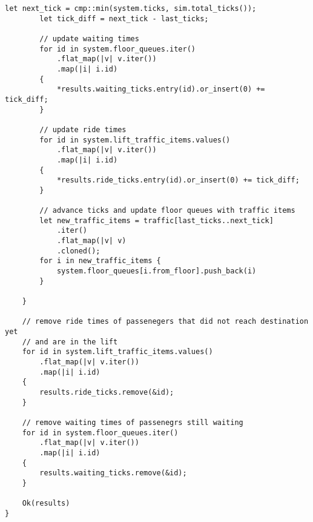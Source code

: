 \begin{lstlisting}[caption={Implementation of a single simulation run}, label={lst:app:simsinglerun}]
        let next_tick = cmp::min(system.ticks, sim.total_ticks());
        let tick_diff = next_tick - last_ticks;

        // update waiting times
        for id in system.floor_queues.iter()
            .flat_map(|v| v.iter())
            .map(|i| i.id)
        {
            *results.waiting_ticks.entry(id).or_insert(0) += tick_diff;
        }

        // update ride times
        for id in system.lift_traffic_items.values()
            .flat_map(|v| v.iter())
            .map(|i| i.id)
        {
            *results.ride_ticks.entry(id).or_insert(0) += tick_diff;
        }

        // advance ticks and update floor queues with traffic items
        let new_traffic_items = traffic[last_ticks..next_tick]
            .iter()
            .flat_map(|v| v)
            .cloned();
        for i in new_traffic_items {
            system.floor_queues[i.from_floor].push_back(i)
        }

    }

    // remove ride times of passenegers that did not reach destination yet
    // and are in the lift
    for id in system.lift_traffic_items.values()
        .flat_map(|v| v.iter())
        .map(|i| i.id)
    {
        results.ride_ticks.remove(&id);
    }

    // remove waiting times of passenegrs still waiting
    for id in system.floor_queues.iter()
        .flat_map(|v| v.iter())
        .map(|i| i.id)
    {
        results.waiting_ticks.remove(&id);
    }

    Ok(results)
}
\end{lstlisting}
